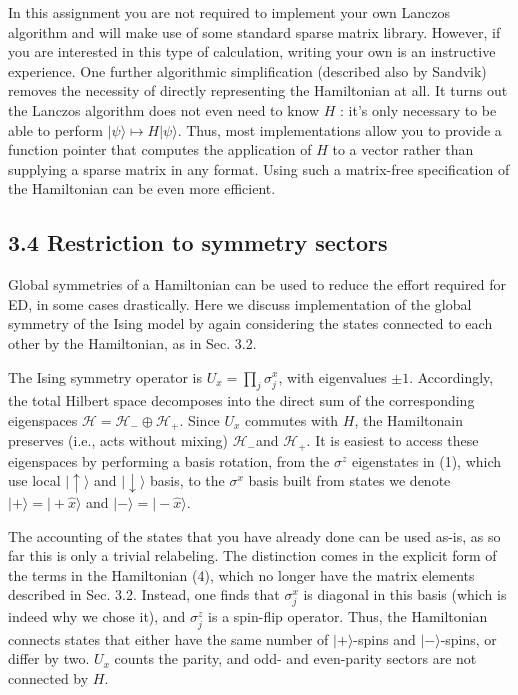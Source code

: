 \documentclass[12pt]{article}
\begin{document}
In this assignment you are not required to implement your own Lanczos algorithm and will make use of some standard sparse matrix library. However, if you are interested in this type of calculation, writing your own is an instructive experience. One further algorithmic simplification (described also by Sandvik) removes the necessity of directly representing the Hamiltonian at all. It turns out the Lanczos algorithm does not even need to know $H$ : it's only necessary to be able to perform $|\psi\rangle \mapsto H|\psi\rangle$. Thus, most implementations allow you to provide a function pointer that computes the application of $H$ to a vector rather than supplying a sparse matrix in any format. Using such a matrix-free specification of the Hamiltonian can be even more efficient.

\subsection*{3.4 Restriction to symmetry sectors}
Global symmetries of a Hamiltonian can be used to reduce the effort required for ED, in some cases drastically. Here we discuss implementation of the global symmetry of the Ising model by again considering the states connected to each other by the Hamiltonian, as in Sec. 3.2.

The Ising symmetry operator is $U_{x}=\prod_{j} \sigma_{j}^{x}$, with eigenvalues $\pm 1$. Accordingly, the total Hilbert space decomposes into the direct sum of the corresponding eigenspaces $\mathcal{H}=\mathcal{H}_{-} \oplus \mathcal{H}_{+}$. Since $U_{x}$ commutes with $H$, the Hamiltonain preserves (i.e., acts without mixing) $\mathcal{H}_{-}$and $\mathcal{H}_{+}$. It is easiest to access these eigenspaces by performing a basis rotation, from the $\sigma^{z}$ eigenstates in (1), which use local $|\uparrow\rangle$ and $|\downarrow\rangle$ basis, to the $\sigma^{x}$ basis built from states we denote $|+\rangle=|+\hat{x}\rangle$ and $|-\rangle=|-\hat{x}\rangle$.

The accounting of the states that you have already done can be used as-is, as so far this is only a trivial relabeling. The distinction comes in the explicit form of the terms in the Hamiltonian (4), which no longer have the matrix elements described in Sec. 3.2. Instead, one finds that $\sigma_{j}^{x}$ is diagonal in this basis (which is indeed why we chose it), and $\sigma_{j}^{z}$ is a spin-flip operator. Thus, the Hamiltonian connects states that either have the same number of $|+\rangle$-spins and $|-\rangle$-spins, or differ by two. $U_{x}$ counts the parity, and odd- and even-parity sectors are not connected by $H$.
\end{document}
